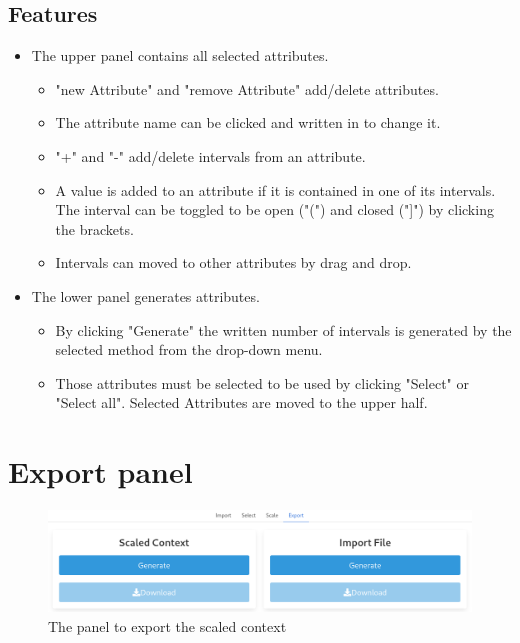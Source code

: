\documentclass[]{article}
\begin{document}
\subsection{Features}
\begin{itemize}
    \item The upper panel contains all selected attributes.
    \begin{itemize}
        \item "new Attribute" and "remove Attribute" add/delete attributes. 
        \item The attribute name can be clicked and written in to change it.
        \item "+" and "-" add/delete intervals from an attribute.
        \item A value is added to an attribute if it is contained in one of its intervals. The interval can be toggled to be open ("(") and closed ("]") by clicking the brackets.
        \item Intervals can moved to other attributes by drag and drop.
    \end{itemize}
    \item The lower panel generates attributes.
    \begin{itemize}
        \item By clicking "Generate" the written number of intervals is generated by the selected method from the drop-down menu.
        \item Those attributes must be selected to be used by clicking "Select" or "Select all". Selected Attributes are moved to the upper half.
    \end{itemize}
\end{itemize}

\section{Export panel}
\begin{figure}[H]
	\includegraphics[width=\linewidth]{images/export.png}
	\caption{The panel to export the scaled context}
	\label{fig:p4}
\end{figure}
\end{document}
